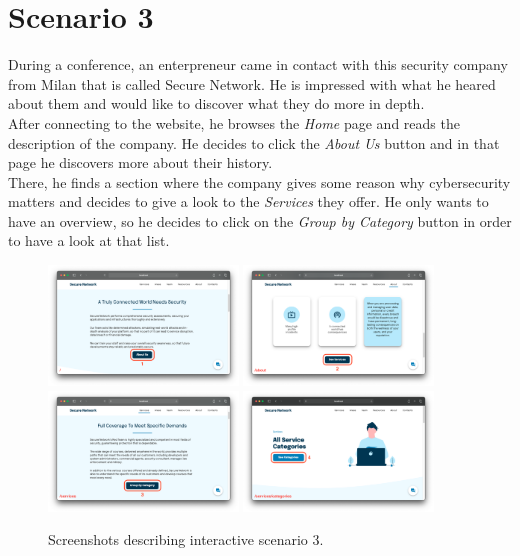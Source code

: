 \documentclass[12pt]{report}
\begin{document}
\section{Scenario 3}
During a conference, an enterpreneur came in contact with this security company from Milan that is called Secure Network.
He is impressed with what he heared about them and would like to discover what they do more in depth.
\\
\noindent
After connecting to the website, he browses the \emph{Home} page and reads the description of the company. 
He decides to click the \emph{About Us} button and in that page he discovers more about their history.
\\
\noindent
There, he finds a section where the company gives some reason why cybersecurity matters and decides to give a look to the \emph{Services} they offer.
He only wants to have an overview, so he decides to click on the \emph{Group by Category} button in order to have a look at that list.

\begin{figure}[H]
	\centering
	\includegraphics[width=0.45\textwidth]{scenarios/3/1.png}
	\includegraphics[width=0.45\textwidth]{scenarios/3/2.png}
	\includegraphics[width=0.45\textwidth]{scenarios/3/3.png}
	\includegraphics[width=0.45\textwidth]{scenarios/3/4.png}
	\caption{Screenshots describing interactive scenario 3.}
\end{figure}
\end{document}

